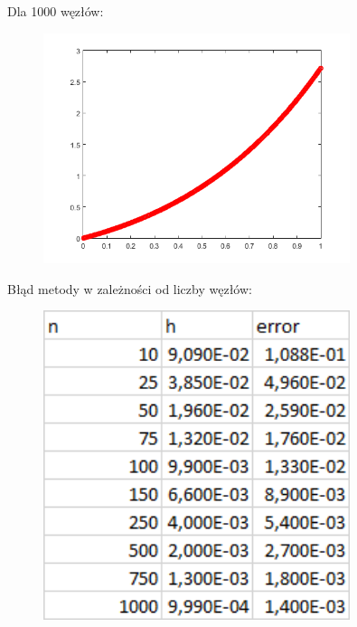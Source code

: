 \begin{samepage}
	Dla 1000 węzłów:
	
	\begin{figure}[!ht]
		\begin{center}
			\includegraphics[width=0.8\textwidth]{Lab4/charts/zad4/2/1000.png}
		\end{center}
	\end{figure}
	\FloatBarrier
\end{samepage}    

\newpage

\begin{samepage}
	Błąd metody w zależności od liczby węzłów:
	\begin{figure}[!ht]
		\begin{center}
			\includegraphics[width=0.8\textwidth]{Lab4/charts/zad4/2/error_dane.png}
		\end{center}
	\end{figure}
	\FloatBarrier
\end{samepage} 

